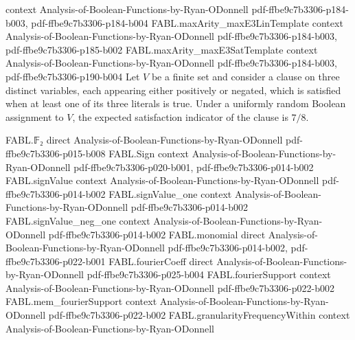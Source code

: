 \begin{theorem}
  {context}
  {Analysis-of-Boolean-Functions-by-Ryan-ODonnell}
  {pdf-ffbe9c7b3306-p184-b003,
    pdf-ffbe9c7b3306-p184-b004}
\proofstep
  {FABL.maxArity_maxE3LinTemplate}
  {context}
  {Analysis-of-Boolean-Functions-by-Ryan-ODonnell}
  {pdf-ffbe9c7b3306-p184-b003,
    pdf-ffbe9c7b3306-p185-b002}
\proofstep
  {FABL.maxArity_maxE3SatTemplate}
  {context}
  {Analysis-of-Boolean-Functions-by-Ryan-ODonnell}
  {pdf-ffbe9c7b3306-p184-b003,
    pdf-ffbe9c7b3306-p190-b004}
Let $V$ be a finite set and consider a clause on three distinct variables, each
appearing either positively or negated, which is satisfied when at least one of its
three literals is true. Under a uniformly random Boolean assignment to $V$, the expected
satisfaction indicator of the clause is $7/8$.
\end{theorem}

\begin{theorem}
\label{FABL.expect_satisfiedIndicators_maxE3Sat}
\leanok
{}
\proofstep
  {FABL.𝔽₂}
  {direct}
  {Analysis-of-Boolean-Functions-by-Ryan-ODonnell}
  {pdf-ffbe9c7b3306-p015-b008}
\proofstep
  {FABL.Sign}
  {context}
  {Analysis-of-Boolean-Functions-by-Ryan-ODonnell}
  {pdf-ffbe9c7b3306-p020-b001,
    pdf-ffbe9c7b3306-p014-b002}
\proofstep
  {FABL.signValue}
  {context}
  {Analysis-of-Boolean-Functions-by-Ryan-ODonnell}
  {pdf-ffbe9c7b3306-p014-b002}
\proofstep
  {FABL.signValue_one}
  {context}
  {Analysis-of-Boolean-Functions-by-Ryan-ODonnell}
  {pdf-ffbe9c7b3306-p014-b002}
\proofstep
  {FABL.signValue_neg_one}
  {context}
  {Analysis-of-Boolean-Functions-by-Ryan-ODonnell}
  {pdf-ffbe9c7b3306-p014-b002}
\proofstep
  {FABL.monomial}
  {direct}
  {Analysis-of-Boolean-Functions-by-Ryan-ODonnell}
  {pdf-ffbe9c7b3306-p014-b002,
    pdf-ffbe9c7b3306-p022-b001}
\proofstep
  {FABL.fourierCoeff}
  {direct}
  {Analysis-of-Boolean-Functions-by-Ryan-ODonnell}
  {pdf-ffbe9c7b3306-p025-b004}
\proofstep
  {FABL.fourierSupport}
  {context}
  {Analysis-of-Boolean-Functions-by-Ryan-ODonnell}
  {pdf-ffbe9c7b3306-p022-b002}
\proofstep
  {FABL.mem_fourierSupport}
  {context}
  {Analysis-of-Boolean-Functions-by-Ryan-ODonnell}
  {pdf-ffbe9c7b3306-p022-b002}
\proofstep
  {FABL.granularityFrequencyWithin}
  {context}
  {Analysis-of-Boolean-Functions-by-Ryan-ODonnell}

\end{theorem}

